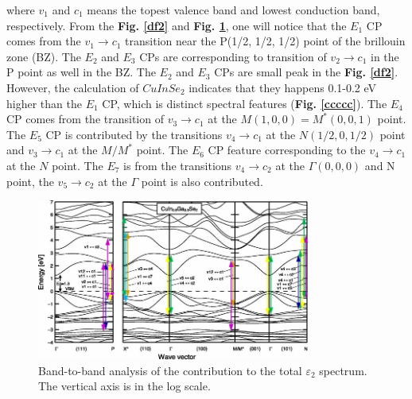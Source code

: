 \documentclass[a4paper, 12pt, titlepage,oneside,drop]{kthesis}
\begin{document}
where $v_1$ and $c_1$ means the topest valence band and lowest conduction band, respectively. From the \textbf{Fig. \ref{df2}} and \textbf{Fig. \ref{df3}}, one will notice that the $E_1$ CP comes from 
the $v_1 \longrightarrow c_1$
transition near the P(1/2, 1/2, 1/2) point of the brillouin zone (BZ). The $E_2$ and $E_3$ CPs are corresponding to transition of $v_2 \longrightarrow c_1$ in the P point
as well in the BZ.
 The $E_2$ and $E_3$ CPs are small peak in the \textbf{Fig. \ref{df2}}. However, the calculation of $CuInSe_2$ indicates that they happens 0.1-0.2 eV higher than 
the $E_1$ CP, which is distinct spectral features (\textbf{Fig. \ref{ccccc}}). The $E_4$ CP comes from the transition of $v_3 \longrightarrow c_1$ at the $M (1,0,0) = M^*(0,0,1)$ point.
The $E_5$ CP is contributed by the transitions $v_4 \longrightarrow c_1$ at the $N (1/2,0,1/2)$ point and $v_3 \longrightarrow c_1$ at the $M/M^*$ point. The $E_6$ CP feature
corresponding to the  $v_4 \longrightarrow c_1$ at the $N$ point. The $E_7$ is from the transitions $v_4 \longrightarrow c_2$ at the $\Gamma (0,0,0)$ and N point, the 
  $v_5 \longrightarrow c_2$ at the $\Gamma$ point is also contributed.
 \begin{figure}[H]
    \begin{center}
            \includegraphics[width=0.8\textwidth]{333333}
     \end{center}
    \caption{Band-to-band analysis of the contribution to the total $\varepsilon_2$ spectrum. The vertical axis is in the log scale.}
   \label{df3}
\end{figure}
\end{document}
